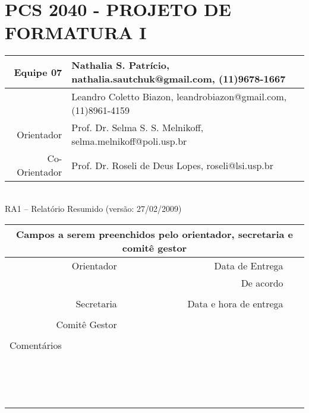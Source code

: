 \documentclass[a4paper,12pt,font=plain,header=plain]{abnt}
\begin{document}
  \setcounter{secnumdepth}{-1}
  \capa

  \renewenvironment{center}{}{}
  \section{PCS 2040 - PROJETO DE FORMATURA I}
 
	\begin{tabular}[|l|]{ |r|l| }
	\hline
		Equipe 07 & Nathalia S. Patrício, nathalia.sautchuk@gmail.com, (11)9678-1667 \\
	\hline
		& Leandro Coletto Biazon, leandrobiazon@gmail.com, (11)8961-4159 \\
	\hline
		Orientador & Prof. Dr. Selma S. S. Melnikoff, selma.melnikoff@poli.usp.br \\
	\hline
		Co-Orientador & Prof. Dr. Roseli de Deus Lopes, roseli@lsi.usp.br \\
	\hline
	\end{tabular} \\
	
	RA1 – Relatório Resumido (versão: 27/02/2009) \\
	
	\begin{tabular}{ |r|r|r| }
	\hline
		\multicolumn{3}{|c|}{Campos a serem preenchidos pelo orientador, secretaria e comitê gestor} \\
	\hline
		Orientador & Data de Entrega &  \\
	\hline
		& De acordo &  \\
	\hline
		& &  \\
	\hline
		Secretaria & Data e hora de entrega &  \\
	\hline
		&  &  \\
	\hline
		Comitê Gestor &  &  \\
	\hline
		&  &  \\
	\hline
		\multicolumn{3}{|l|}{Comentários} \\
		\multicolumn{3}{|l|}{} \\
		\multicolumn{3}{|l|}{} \\
		\multicolumn{3}{|l|}{} \\
		\multicolumn{3}{|l|}{} \\
		\multicolumn{3}{|l|}{} \\
		\multicolumn{3}{|l|}{} \\
		\multicolumn{3}{|l|}{} \\
		\multicolumn{3}{|l|}{} \\
		\multicolumn{3}{|l|}{} \\
		\multicolumn{3}{|l|}{} \\
		\multicolumn{3}{|l|}{} \\
		\multicolumn{3}{|l|}{} \\
		\multicolumn{3}{|l|}{} \\
		\multicolumn{3}{|l|}{} \\
		\multicolumn{3}{|l|}{} \\
	\hline
	\end{tabular}
\end{document}
